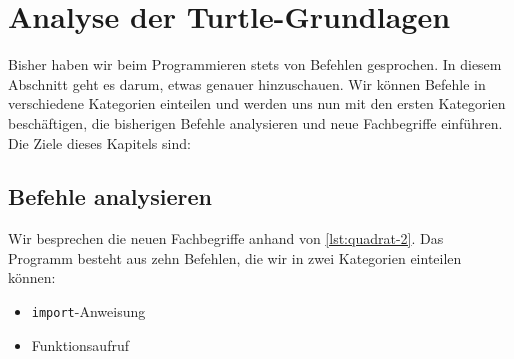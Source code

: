 
\toggletrue{image}
\toggletrue{imagehover}


\chapter{Analyse der Turtle-Grundlagen}
\label{ch:analyse_der_turtle-grundlagen}

Bisher haben wir beim Programmieren stets von Befehlen gesprochen. In diesem Abschnitt geht es darum, etwas genauer hinzuschauen. Wir können Befehle in verschiedene Kategorien einteilen und werden uns nun mit den ersten Kategorien beschäftigen, die bisherigen Befehle analysieren und neue Fachbegriffe einführen. Die Ziele dieses Kapitels sind:\\


\section{Befehle analysieren}
\label{sec:befehle-analysieren}

Wir besprechen die neuen Fachbegriffe anhand von \autoref{lst:quadrat-2}. Das Programm besteht aus zehn Befehlen, die wir in zwei Kategorien einteilen können:

\begin{itemize}
    \item \lstinline[language={python3}]{import}-Anweisung
    \item Funktionsaufruf
\end{itemize}

